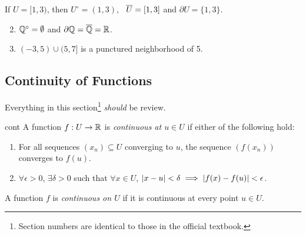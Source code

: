 \begin{examples}{}{}
\exstart If $U=[1,3)$, then $U^\circ=(1,3)$, \ $\overline{U}=[1,3]$ and $\partial U=\{1,3\}$.
\begin{enumerate}\setcounter{enumi}{1}
  \item $\mathbb{Q}^\circ=\emptyset$ and $\partial\mathbb{Q}=\overline{\mathbb{Q}}=\mathbb{R}$.
  \item $(-3,5)\cup (5,7]$ is a punctured neighborhood of 5.
\end{enumerate}
\end{examples}
\goodbreak

\setcounter{subsection}{16}
\subsection{Continuity of Functions}\label{sec:cont}

Everything in this section\footnote{Section numbers are identical to those in the official textbook.} \emph{should} be review.

\begin{defn}{}{cont}
A function $f:U\to\mathbb{R}$ is \emph{continuous at $u\in U$} if either of the following hold:
\begin{enumerate}
  \item For all sequences $(x_n)\subseteq U$ converging to $u$, the sequence $(f(x_n))$ converges to $f(u)$.
  \item $\forall\epsilon>0$, $\exists\delta>0$ such that $\forall x\in U$, $\left| x-u\right|<\delta\implies\left| f(x)-f(u)\right|<\epsilon$.
\end{enumerate}
A function $f$ is \emph{continuous on $U$} if it is continuous at every point $u\in U$.
\end{defn}


